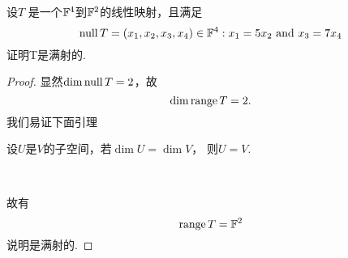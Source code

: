\begin{problem}{13}
设$T$ 是一个$\mathbb{F}^4$到$\mathbb{F}^2$的线性映射，且满足
\begin{displaymath}
	\Null T = {(x_1,x_2,x_3,x_4)\in\F^4:x_1=5x_2\ \mathrm{and}\ x_3=7x_4}
\end{displaymath}
证明T是满射的.
\end{problem}

\begin{proof}
	显然$\dim \operatorname{null} T = 2$，故
	\begin{displaymath}
		\dim \operatorname{range} T =2.
	\end{displaymath}
	我们易证下面引理
	\
	\begin{lemma}
		设$U$是$V$的子空间，若$\dim U =\dim V $，
		则$U=V$.
	\end{lemma}
	\

	故有
	\begin{displaymath}
		\operatorname{range} T = \mathbb{F}^2
	\end{displaymath}
	说明是满射的.
\end{proof}
